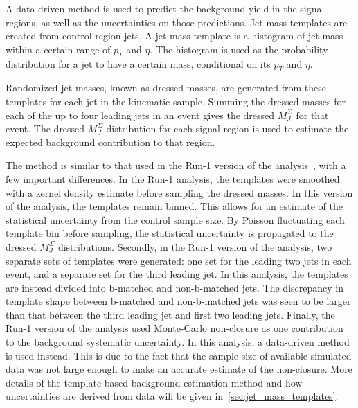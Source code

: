 A data-driven method is used to predict the background yield in the signal regions, as well as the uncertainties on those predictions.
Jet mass templates are created from control region jets.
A jet mass template is a histogram of jet mass within a certain range of $p_{T}$ and $\eta$.
The histogram is used as the probability distribution for a jet to have a certain mass, conditional on its $p_{T}$ and $\eta$.

Randomized jet masses, known as dressed masses, are generated from these templates for each jet in the kinematic sample.
Summing the dressed masses for each of the up to four leading jets in an event gives the dressed $M_{J}^{\Sigma}$ for that event.
The dressed $M_{J}^{\Sigma}$ distribution for each signal region is used to estimate the expected background contribution to that region.

The method is similar to that used in the Run-1 version of the analysis~\cite{run1-multijet}, with a few important differences.
In the Run-1 analysis, the templates were smoothed with a kernel density estimate before sampling the dressed masses.
In this version of the analysis, the templates remain binned.
This allows for an estimate of the statistical uncertainty from the control sample size.
By Poisson fluctuating each template bin before sampling, the statistical uncertainty is propagated to the dressed $M_J^{\Sigma}$ distributions.
Secondly, in the Run-1 version of the analysis, two separate sets of templates were generated: one set for the leading two jets in each event, and a separate set for the third leading jet.
In this analysis, the templates are instead divided into b-matched and non-b-matched jets.
The discrepancy in template shape between b-matched and non-b-matched jets was seen to be larger than that between the third leading jet and first two leading jets.
Finally, the Run-1 version of the analysis used Monte-Carlo non-closure as one contribution to the background systematic uncertainty.
In this analysis, a data-driven method is used instead.
This is due to the fact that the sample size of available simulated data was not large enough to make an accurate estimate of the non-closure.
More details of the template-based background estimation method and how uncertainties are derived from data will be given in~\ref{sec:jet_mass_templates}.